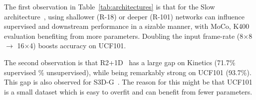 \documentclass[final]{cvpr}
\newcommand{\tblref}[1]{Table~\ref{#1}}
\def\x{$\times$}
\begin{document}
	The first observation in \tblref{tab:architectures} is that for the Slow architecture~\cite{Feichtenhofer19}, using shallower (R-18) or deeper (R-101) networks can influence supervised and downstream performance in a sizable manner, with MoCo, K400 evaluation benefiting from more parameters. Doubling the input frame-rate (8\x8 $\rightarrow$ 16\x4) boosts accuracy on UCF101.
	
	The second observation is that R2+1D~\cite{Tran18} has a large gap on Kinetics (71.7\% supervised \% unsupervised), while being remarkably strong on UCF101 (93.7\%). This gap is also observed for S3D-G~\cite{Xie18s3d}. The reason for this might be that UCF101 is a small dataset which is easy to overfit and can benefit from fewer parameters. 

\end{document}
